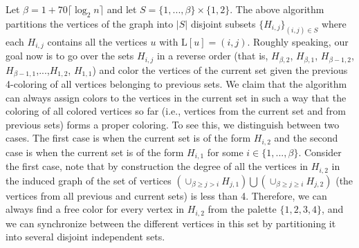 \documentclass{article}
\theoremstyle{definition}
\begin{document}
Let $\beta = 1 + 70\lceil \log_{2}n \rceil$ and let $S = \{1,...,\beta\} \times \{1,2\}$. The above algorithm partitions the vertices of the graph into $|S|$ disjoint subsets $\{H_{i,j}\}_{(i,j) \in S}$ where each $H_{i,j}$ contains all the vertices $u$ with $\text{L}[u] = (i,j)$.
Roughly speaking, our goal now is to go over the sets $H_{i,j}$ in a reverse order (that is, $H_{\beta,2}$, $H_{\beta,1}$, $H_{\beta-1,2}$, $H_{\beta-1,1}$,...,$H_{1,2}$, $H_{1,1}$) and color the vertices of the current set given the previous 4-coloring of all vertices belonging to previous sets.
We claim that the algorithm can always assign colors to the vertices in the current set in such a way that the coloring of all colored vertices so far (i.e., vertices from the current set and from previous sets)
forms a proper coloring.
To see this, we distinguish between two cases.
The first case is when the current set is of the form $H_{i,2}$ and the second case is when the current set is of the form  $H_{i,1}$ for some $i \in \{1, ..., \beta\}$.
Consider the first case, note that by construction the degree of all the vertices in $H_{i,2}$ in the induced graph of the set of vertices $\left(\cup_{\beta \geq j>i}{H_{j,1}}\right) \bigcup \left(\cup_{\beta \geq j \geq i}{H_{j,2}} \right)$
(the vertices from all previous and current sets) is less than 4.
Therefore, we can always find a free color for every vertex in $H_{i,2}$ from the palette $\{1,2,3,4\}$, and we can synchronize between the different vertices in this set by partitioning it into several disjoint independent sets.
\end{document}
